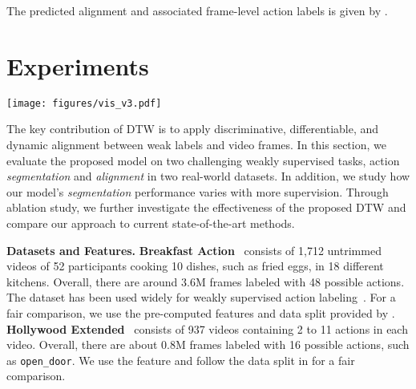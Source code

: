 \documentclass[10pt,twocolumn,letterpaper]{article}
\newcommand{\dttw}{DTW\xspace}
\begin{document}
The predicted alignment  and associated frame-level action labels  is given by .

 \section{Experiments}
\label{sec:experiments}


\begin{figure*}[tb]
\centering
   \texttt{[image: figures/vis\_v3.pdf]}
   \vspace{-4mm}
   \caption{
   Qualitative results on the Breakfast dataset.  Colors indicate  actions and the horizontal axis is time. 
   While both \emph{Ours w/o Discriminative} and \emph{NN-Viterbi} introduce additional actions not appearing in the ground truth, \emph{Ours w/o Discriminative} has better action boundaries because of the differentiable loss.
   \emph{Ours \dttw} is the only model that correctly captures all the occurring actions with discriminative modeling. In addition, this also leads to more accurate boundaries of actions.
   }
   \vspace{-1mm}
\label{fig:vis}
\end{figure*}

The key contribution of DTW is to apply discriminative, differentiable, and dynamic alignment between weak labels and video frames. 
In this section, we evaluate the proposed model on two challenging weakly supervised tasks, action \textit{segmentation} and \textit{alignment} in two real-world datasets. In addition, we study how our model's \textit{segmentation} performance varies with more supervision. Through ablation study, we further investigate the effectiveness of the proposed \dttw and compare our approach to current state-of-the-art methods.



\vspace{1mm}
{\noindent \bf Datasets and Features.} {\bf Breakfast Action}~\cite{kuehne2014language} consists of 1,712 untrimmed videos of 52 participants cooking 10 dishes, such as fried eggs, in 18 different kitchens.  Overall, there are around 3.6M frames labeled with 48 possible actions. The dataset has been used widely for weakly supervised action labeling~\cite{ding2018weakly,huang2016connectionist,richard2017weakly,richard2018neuralnetwork}. For a fair comparison, we use the pre-computed features and data split provided by \cite{kuehne2014language}. {\bf Hollywood Extended}~\cite{bojanowski2014weakly} consists of 937 videos containing 2 to 11 actions in each video. Overall, there are about 0.8M frames labeled with 16 possible actions, such as \verb|open_door|. We use the feature and follow the data split in \cite{bojanowski2014weakly} for a fair comparison. 
\end{document}
